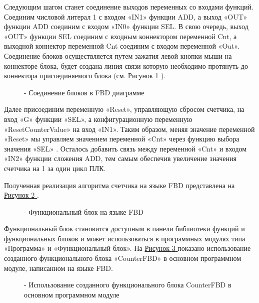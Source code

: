 \documentclass[letterpaper,10pt,russian]{sphinxmanual}
\begin{document}
Следующим шагом станет соединение выходов переменных со входами функций.
Соединим числовой литерал 1 с входом «IN1» функции ADD, а выход «OUT»
функции ADD соединим с входом «IN0» функции SEL. В свою очередь, выход
«OUT» функции SEL соединим с входным коннектором переменной Cnt, а
выходной коннектор переменной Cnt соединим с входом переменной «Out».
Соединение блоков осуществляется путем зажатия левой кнопки мыши на
коннекторе блока, будет создана линия связи которую необходимо протянуть
до коннектора присоединяемого блока (см. \hyperref[usage_guide/work_with_project:image169]{Рисунок \ref{usage_guide/work_with_project:image169} }).
\begin{figure}[htbp]
\centering
\capstart

\noindent{}
\caption{- Соединение блоков в FBD диаграмме}\label{usage_guide/work_with_project:image169}\end{figure}

Далее присоединим переменную «Reset», управляющую сбросом счетчика, на
вход «G» функции «SEL», а конфигурационную переменную
«ResetCounterValue» на вход «IN1». Таким образом, меняя значение
переменной «Reset» мы управляем значением переменной «Cnt» через функцию
выбора значения «SEL» . Осталось добавить связь между переменной «Cnt» и
входом «IN2» функции сложения ADD, тем самым обеспечив увеличение
значения счетчика на 1 за один цикл ПЛК.

Полученная реализация алгоритма счетчика на языке FBD представлена
на \hyperref[usage_guide/work_with_project:image170]{Рисунок \ref{usage_guide/work_with_project:image170} }.
\begin{figure}[htbp]
\centering
\capstart

\noindent{}
\caption{- Функциональный блок на языке FBD}\label{usage_guide/work_with_project:image170}\end{figure}

Функциональный блок становится доступным в панели библиотеки функций и
функциональных блоков и может использоваться в программных
модулях типа «Программа» и «Функциональный блок». На \hyperref[usage_guide/work_with_project:image171]{Рисунок \ref{usage_guide/work_with_project:image171} } показано
использование созданного функционального блока «CounterFBD» в основном
программном модуле, написанном на языке FBD.
\begin{figure}[htbp]
\centering
\capstart

\noindent{}
\caption{- Использование созданного функционального блока CounterFBD в основном программном модуле}\label{usage_guide/work_with_project:image171}\end{figure}
\end{document}
